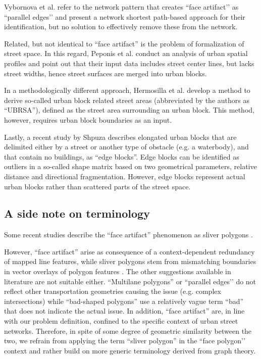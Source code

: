 Vybornova et al. \cite{vybornova_automated_2022} refer to the network pattern that creates ``face artifact’’ as ``parallel edges’’ and present a network shortest path-based approach for their identification, but no solution to effectively remove these from the network.

Related, but not identical to ``face artifact'' is the problem of formalization of street space. In this regard, Peponis et al. \cite{peponis_measuring_2007} conduct an analysis of urban spatial profiles and point out that their input data includes street center lines, but lacks street widths, hence street surfaces are merged into urban blocks. 

In a methodologically different approach, Hermosilla et al. \cite{hermosilla_using_2014} develop a method to derive so-called urban block related street areas (abbreviated by the authors as ``UBRSA''), defined as the street area surrounding an urban block. This method, however, requires urban block boundaries as an input.

Lastly, a recent study by Shpuza \cite{shpuza_shape_2022} describes elongated urban blocks that are delimited either by a street or another type of obstacle (e.g. a waterbody), and that contain no buildings, as ``edge blocks''. Edge blocks can be identified as outliers in a so-called shape matrix based on two geometrical parameters, relative distance and directional fragmentation. However, edge blocks represent actual urban blocks rather than scattered parts of the street space.

\subsection*{A side note on terminology}

Some recent studies describe the ``face artifact'' phenomenon as sliver polygons \cite{grippa_mapping_2018, sanzana_decomposition_2018, ludwig_mapping_2021}. 

However, ``face artifact'' arise as consequence of a context-dependent redundancy of mapped line features, while sliver polygons stem from mismatching boundaries in vector overlays of polygon features \cite{goodchild_statistical_1978, fischer_using_1993, delafontaine_assessment_2009}. The other suggestions available in literature are not suitable either. ``Multilane polygons'' \cite{li_polygon-based_2014} or ``parallel edges’’ \cite{vybornova_automated_2022} do not reflect other transportation geometries causing the issue (e.g. complex intersections) while ``bad-shaped polygons'' use a relatively vague term ``bad'' that does not indicate the actual issue. In addition, ``face artifact'' are, in line with our problem definition, confined to the specific context of urban street networks. Therefore, in spite of some degree of geometric similarity between the two, we refrain from applying the term ``sliver polygon'' in the ``face polygon’’ context and rather build on more generic terminology derived from graph theory.

